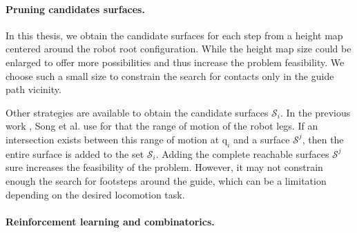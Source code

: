 \paragraph{Pruning candidates surfaces.\label{subsub:mip:discussion:candidate_surfaces}}
In this thesis, we obtain the candidate surfaces for each step from a height map centered around the robot root configuration. While the height map size could be enlarged to offer more possibilities and thus increase the problem feasibility.
We choose such a small size to constrain the search for contacts only in the guide path vicinity.

Other strategies are available to obtain the candidate surfaces $\mathcal{S}_i$.
In the previous work \cite{sl1m_v2}, Song et al. use for that the range of motion of the robot legs.
If an intersection exists between this range of motion at $\mbox{q}_i$ and a surface $\mathcal{S}^j$, then the entire surface is added to the set $\mathcal{S}_i$.
Adding the complete reachable surfaces $\mathcal{S}^j$ sure increases the feasibility of the problem. 
However, it may not constrain enough the search for footsteps around the guide, which can be a limitation depending on the desired locomotion task.


\paragraph{Reinforcement learning and combinatorics.}

